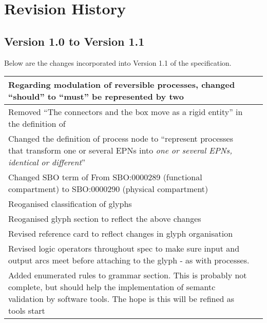 \chapter{Revision History}

\section{Version 1.0 to Version 1.1}

Below are the changes incorporated into Version 1.1 of the \SBGNPDLone specification.

\begin{center}
\label{tab:revision history}
\tablelasttail{\hline}
\begin{supertabular}{|p{12cm}|c|}\hline
Regarding modulation of reversible processes, changed ``should'' to ``must'' be represented by two  & \\\hline
Removed ``The connectors and the box move as a rigid entity'' in the definition of  & \\\hline
Changed the definition of process node to ``represent processes that transform one or several EPNs into \emph{one or several EPNs, identical or different}''& \\\hline
Changed SBO term of  From SBO:0000289 (functional compartment) to SBO:0000290 (physical compartment) & \\\hline
Reoganised classification of glyphs & \\\hline
Reoganised glyph section to reflect the above changes & \\\hline
Revised reference card to reflect changes in glyph organisation &
\\\hline
Revised logic operators throughout spec to make sure input and output
arcs meet before attaching to the glyph - as with processes. &
\\\hline
Added enumerated rules to grammar section. This is probably not
complete, but should help the implementation of semantc validation by
software tools. The hope is this will be refined as tools start

\end{supertabular}
\end{center}
